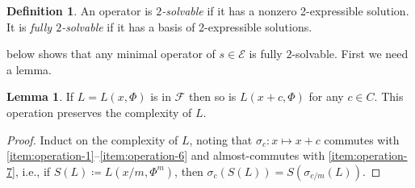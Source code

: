 \documentclass[11pt,reqno]{amsart}
\theoremstyle{definition}
\newtheorem{lemma}[theorem]{Lemma}
\newtheorem{definition}[theorem]{Definition}
\begin{document}
\begin{definition} \label{solv2}
    An operator is \emph{$2$-solvable} if it has a nonzero 2-expressible solution. It is \emph{fully $2$-solvable} if it has a basis of 2-expressible solutions.
\end{definition}

 below shows that any minimal operator of $s\in \mathcal{E}$ is fully $2$-solvable. First we need a lemma.

\begin{lemma}\label{lemma:shift}
    If $L = L(x, \Phi)$ is in $\mathcal{F}$ then so is $L(x+c, \Phi)$ for any $c\in C$. This operation preserves the complexity of $L$.
\end{lemma}
\begin{proof}
    Induct on the complexity of $L$, 
    noting that $\sigma_{c}\colon x \mapsto x+c$ commutes with \ref{item:operation-1}--\ref{item:operation-6} and almost-commutes with \ref{item:operation-7}, 
    i.e., if $S(L)\coloneqq L(x/m,\Phi^{m})$,
    then $\sigma_{c}(S(L))=S(\sigma_{c/m}(L))$.
\end{proof}
\end{document}
